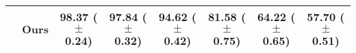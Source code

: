 \begin{table}[t]
{\begin{tabular}{l l c c c c c c}
     & Ours & {\bf 98.37} {\scriptsize ($\pm$ 0.24)} & {\bf 97.84} {\scriptsize ($\pm$ 0.32)} & {\bf 94.62} {\scriptsize ($\pm$ 0.42)} & {\bf 81.58} {\scriptsize ($\pm$ 0.75)} & {\bf 64.22} {\scriptsize ($\pm$ 0.65)} & {\bf 57.70} {\scriptsize ($\pm$ 0.51)} \\
    \bottomrule
\end{tabular}
}
\vspace{-3mm}
\label{tab:results_memory_selection_methods}
\end{table}

\begin{comment}
\begin{table*}[t]
\footnotesize
\centering
\caption{
Performance comparison between RS-MCTS (Ours), Random scheduling (Random), Equal Task Schedule (ETS), and Heuristic Scheduling (Heuristic) with various memory selection methods evaluated across all datasets. 
The replay memory size is $M=10$ and $M=100$ for the 5-task and 10/20-task datasets respectively. We report the mean and standard deviation averaged over 5 seeds. RS-MCTS performs better or on par than the baselines on most datasets and selection methods, where MoF yields the best results %
in general.
}
\scalebox{0.87}{
\begin{tabular}{l l c c c c c c}
    \toprule
     & & \multicolumn{3}{c}{{\bf 5-task Datasets}} & \multicolumn{3}{c}{{\bf 10- and 20-task Datasets}} \\
    \cmidrule(lr){3-5} \cmidrule(lr){6-8}
    {\bf Selection} & {\bf Method} & S-MNIST & S-FashionMNIST & S-notMNIST & P-MNIST & S-CIFAR-100 & S-miniImagenet \\
    \midrule 
    \multirow{4}{*}{Uniform} & Random & 95.91 {\scriptsize ($\pm$ 1.56)}  & 95.82 {\scriptsize ($\pm$ 1.45)} & 92.39 {\scriptsize ($\pm$ 1.29)} & 72.44 {\scriptsize ($\pm$ 1.15)} & 53.99 {\scriptsize ($\pm$ 0.51)} & 48.08 {\scriptsize ($\pm$ 1.36)} \\
     & ETS  & 94.02 {\scriptsize ($\pm$ 4.25)} &  95.81 {\scriptsize ($\pm$ 3.53)} & 91.01 {\scriptsize ($\pm$ 1.39)} & 71.09 {\scriptsize ($\pm$ 2.31)} & 47.70 {\scriptsize ($\pm$ 2.16)} & 46.97 {\scriptsize ($\pm$ 1.24)} \\
     & Heuristic &  96.02 {\scriptsize ($\pm$ 2.32)} &  97.09 {\scriptsize ($\pm$ 0.62)} & 91.26 {\scriptsize ($\pm$ 3.99)} & 76.68 {\scriptsize ($\pm$ 2.13)} & 57.31 {\scriptsize ($\pm$ 1.21)} & 49.66 {\scriptsize ($\pm$ 1.10)} \\

\end{comment}
